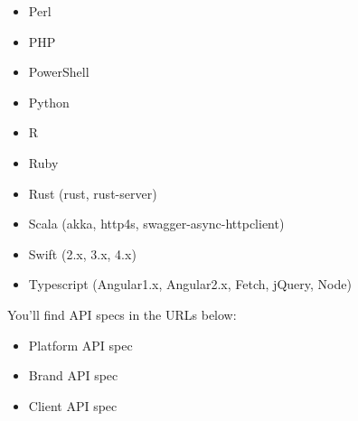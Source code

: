 \documentclass[letterpaper,10pt,english]{sphinxmanual}
\begin{document}
\begin{itemize}
\item {} 
Perl

\item {} 
PHP

\item {} 
PowerShell

\item {} 
Python

\item {} 
R

\item {} 
Ruby

\item {} 
Rust (rust, rust-server)

\item {} 
Scala (akka, http4s, swagger-async-httpclient)

\item {} 
Swift (2.x, 3.x, 4.x)

\item {} 
Typescript (Angular1.x, Angular2.x, Fetch, jQuery, Node)

\end{itemize}

You'll find API specs in the URLs below:
\begin{itemize}
\item {} 
Platform API spec

\item {} 
Brand API spec

\item {} 
Client API spec

\end{itemize}



\renewcommand{\indexname}{Index}
\printindex
\end{document}
